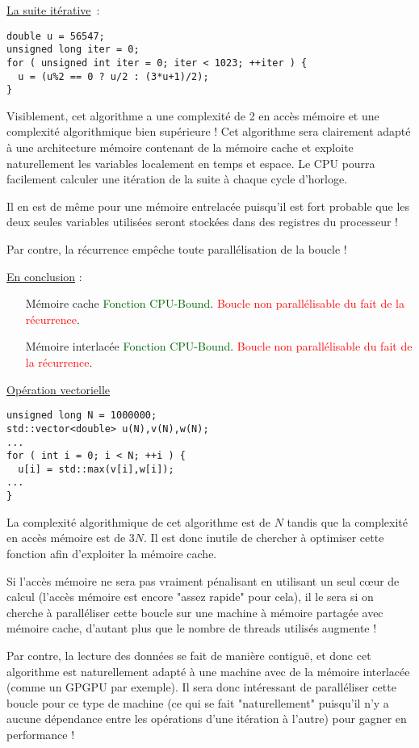 \documentclass[fleqn,11pt]{article}
\begin{document}
\underline{La suite itérative}~:

\begin{lstlisting}
double u = 56547;
unsigned long iter = 0;
for ( unsigned int iter = 0; iter < 1023; ++iter ) {
  u = (u%2 == 0 ? u/2 : (3*u+1)/2);
}
\end{lstlisting}

Visiblement, cet algorithme a une complexité de 2 en accès mémoire et une complexité algorithmique bien supérieure ! Cet algorithme sera clairement adapté à une architecture mémoire contenant de la mémoire cache
et exploite naturellement les variables  localement en temps et espace. Le CPU pourra facilement calculer une itération de la suite à chaque cycle d'horloge. 

Il en est de même pour une mémoire entrelacée puisqu'il est fort probable que les deux seules variables utilisées seront stockées dans des registres du processeur !

Par contre, la récurrence empêche toute parallélisation de la boucle !

\underline{En conclusion} :
\begin{itemize}
\item [Mémoire cache] \textcolor{darkgreen}{Fonction CPU-Bound}. \textcolor{red}{Boucle non parallélisable du fait de la récurrence}.
\item [Mémoire interlacée] \textcolor{darkgreen}{Fonction CPU-Bound}. \textcolor{red}{Boucle non parallélisable du fait de la récurrence}.
\end{itemize}

\underline{Opération vectorielle}

\begin{lstlisting}
unsigned long N = 1000000;
std::vector<double> u(N),v(N),w(N);
...
for ( int i = 0; i < N; ++i ) {
  u[i] = std::max(v[i],w[i]);
...
}
\end{lstlisting}

La complexité algorithmique de cet algorithme est de $N$ tandis que la complexité en accès mémoire
est de $3N$. Il est donc inutile de chercher à optimiser cette fonction afin d'exploiter la mémoire cache.

Si l'accès mémoire ne sera pas vraiment pénalisant en utilisant un seul c{\oe}ur de calcul (l'accès mémoire est encore "assez rapide" pour cela), il le sera si on cherche à paralléliser cette boucle sur une machine à mémoire partagée avec mémoire cache, d'autant plus que le nombre de threads utilisés augmente !

Par contre, la lecture des données se fait de manière contiguë, et donc cet algorithme est naturellement
adapté à une machine avec de la mémoire interlacée (comme un GPGPU par exemple). Il sera donc intéressant
de paralléliser cette boucle pour ce type de machine (ce qui se fait "naturellement" puisqu'il n'y a aucune
dépendance entre les opérations d'une itération à l'autre) pour gagner en performance !
\end{document}
